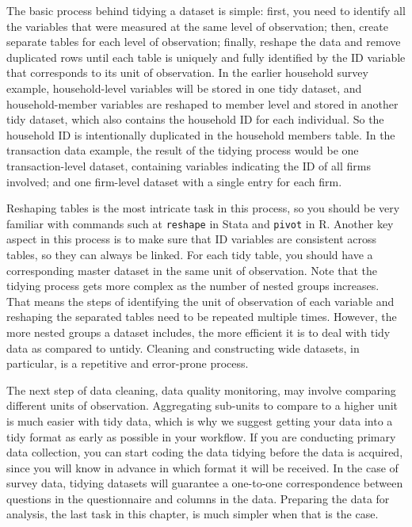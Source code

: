 The basic process behind tidying a dataset is simple: 
first, you need to identify all the variables that were measured at the same level of observation;
then, create separate tables for each level of observation;
finally, reshape 
the data and remove duplicated rows 
until each table is uniquely and fully identified by the ID variable 
that corresponds to its unit of observation.
In the earlier household survey example,
household-level variables will be stored in one tidy dataset, 
and household-member variables are reshaped to member level and stored in another tidy dataset,
which also contains the household ID for each individual.
So the household ID is intentionally duplicated in the household members table.
In the transaction data example,
the result of the tidying process would be one transaction-level dataset, 
containing variables indicating the ID of all firms involved;
and one firm-level dataset with a single entry for each firm.

Reshaping tables is the most intricate task in this process,
so you should be very familiar with commands such at \texttt{reshape} in Stata and \texttt{pivot} in R.
Another key aspect in this process is to make sure that ID variables are consistent across tables,
so they can always be linked.
For each tidy table, you should have a corresponding master dataset in the same unit of observation.
Note that the tidying process gets more complex as the number of nested groups increases.
That means the steps of identifying the unit of observation of each variable
and reshaping the separated tables need to be repeated multiple times.
However, the more nested groups a dataset includes,
the more efficient it is to deal with tidy data as compared to untidy.
Cleaning and constructing wide datasets, in particular,
is a repetitive and error-prone process.

The next step of data cleaning, data quality monitoring,
may involve comparing different units of observation.
Aggregating sub-units to compare to a higher unit is much easier with tidy data,
which is why we suggest getting your data into a tidy format as early as possible in your workflow. 
If you are conducting primary data collection,
you can start coding the data tidying before the data is acquired,
since you will know in advance in which format it will be received.
In the case of survey data,
tidying datasets will guarantee a one-to-one correspondence
between questions in the questionnaire and columns in the data.
Preparing the data for analysis, the last task in this chapter, 
is much simpler when that is the case. 
 
